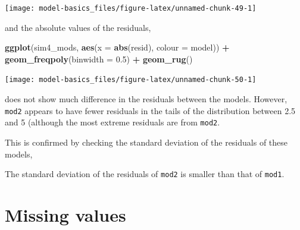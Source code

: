 \documentclass[]{book}
\newenvironment{Shaded}{\begin{snugshade}}{\end{snugshade}}
\newcommand{\CommentTok}[1]{\textcolor[rgb]{0.56,0.35,0.01}{\textit{#1}}}
\newcommand{\DataTypeTok}[1]{\textcolor[rgb]{0.13,0.29,0.53}{#1}}
\newcommand{\FloatTok}[1]{\textcolor[rgb]{0.00,0.00,0.81}{#1}}
\newcommand{\KeywordTok}[1]{\textcolor[rgb]{0.13,0.29,0.53}{\textbf{#1}}}
\newcommand{\NormalTok}[1]{#1}
\newcommand{\OperatorTok}[1]{\textcolor[rgb]{0.81,0.36,0.00}{\textbf{#1}}}
\newcommand{\StringTok}[1]{\textcolor[rgb]{0.31,0.60,0.02}{#1}}
\theoremstyle{plain}
\theoremstyle{remark}
\begin{document}
\begin{center}\texttt{[image: model-basics\_files/figure-latex/unnamed-chunk-49-1]} \end{center}

and the absolute values of the residuals,

\begin{Shaded}
\begin{Highlighting}[]
\KeywordTok{ggplot}\NormalTok{(sim4_mods, }\KeywordTok{aes}\NormalTok{(}\DataTypeTok{x =} \KeywordTok{abs}\NormalTok{(resid), }\DataTypeTok{colour =}\NormalTok{ model)) }\OperatorTok{+}
\StringTok{  }\KeywordTok{geom_freqpoly}\NormalTok{(}\DataTypeTok{binwidth =} \FloatTok{0.5}\NormalTok{) }\OperatorTok{+}
\StringTok{  }\KeywordTok{geom_rug}\NormalTok{()}
\end{Highlighting}
\end{Shaded}

\begin{center}\texttt{[image: model-basics\_files/figure-latex/unnamed-chunk-50-1]} \end{center}

does not show much difference in the residuals between the models.
However, \texttt{mod2} appears to have fewer residuals in the tails of the distribution between 2.5 and 5 (although the most extreme residuals are from \texttt{mod2}.

This is confirmed by checking the standard deviation of the residuals of these models,

\begin{Shaded}
\end{Shaded}

The standard deviation of the residuals of \texttt{mod2} is smaller than that of \texttt{mod1}.

\hypertarget{missing-values-2}{%
\section{Missing values}\label{missing-values-2}}
\end{document}

